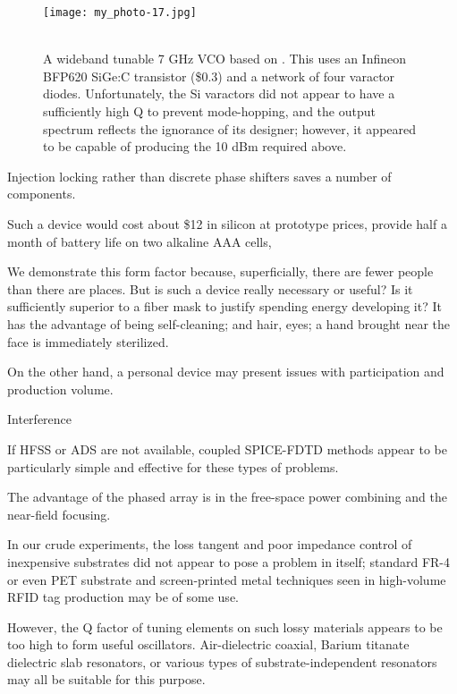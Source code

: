 \documentclass[paper.tex]{subfiles}
\begin{document}
\begin{figure}[H]
	\captionsetup{singlelinecheck = false, justification=justified}
	\centering
	\texttt{[image: my\_photo-17.jpg]}
	\caption{\\ A wideband tunable 7 GHz VCO based on \cite{TripleTuned2008}. This uses an Infineon BFP620 SiGe:C transistor (\$0.3) and a network of four varactor diodes. Unfortunately, the Si varactors did not appear to have a sufficiently high Q to prevent mode-hopping, and the output spectrum reflects the ignorance of its designer; however, it appeared to be capable of producing the 10 dBm required above.}
\end{figure}





Injection locking rather than discrete phase shifters saves a number of components.

Such a device would cost about \$12 in silicon at prototype prices, provide half a month of battery life on two alkaline AAA cells, 


We demonstrate this form factor because, superficially, there are fewer people than there are places. But is such a device really necessary or useful? Is it sufficiently superior to a fiber mask to justify spending energy developing it? It has the advantage of being self-cleaning; and hair, eyes; a hand brought near the face is immediately sterilized.


On the other hand, a personal device may present issues with participation and production volume. 

Interference

If HFSS or ADS are not available, coupled SPICE-FDTD methods appear to be particularly simple and effective for these types of problems.

The advantage of the phased array is in the free-space power combining and the near-field focusing.

In our crude experiments, the loss tangent and poor impedance control of inexpensive substrates did not appear to pose a problem in itself; standard FR-4 or even PET substrate and screen-printed metal techniques seen in high-volume RFID tag production may be of some use. 

However, the Q factor of tuning elements on such lossy materials appears to be too high to form useful oscillators. Air-dielectric coaxial, Barium titanate dielectric slab resonators, or various types of substrate-independent resonators may all be suitable for this purpose.
\end{document}
